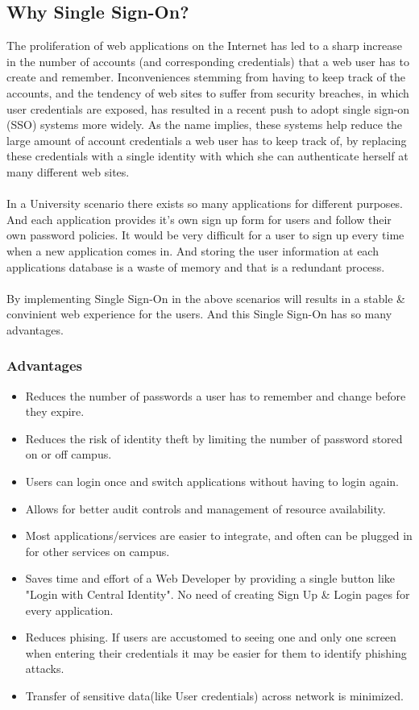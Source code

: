 \documentclass[12pt]{report}
\begin{document}
\subsection{Why Single Sign-On?}
\hspace{6mm}The proliferation of web applications on the Internet has led to a sharp increase in the number of accounts (and corresponding credentials) that a web user has to create and remember. Inconveniences stemming from having to keep track of the accounts, and the tendency of web sites to suffer from security breaches, in which user credentials are exposed, has resulted in a recent push to adopt single sign-on (SSO) systems more widely. As the name implies, these systems help reduce the large amount of account credentials a web user has to keep track of, by replacing these credentials with a single identity with which she can authenticate herself at many different web sites.\\
\\
\hspace{6mm}In a University scenario there exists so many applications for different purposes. And each application provides it's own sign up form for users and follow their own password policies. It would be very difficult for a user to sign up every time when a new application comes in. And storing the user information at each applications database is a waste of memory and that is a redundant process.
	\\
	\\
\hspace{6mm}By implementing Single Sign-On in the above scenarios will results in a stable \& convinient web experience for the users. And this Single Sign-On has so many advantages.
	\\
	\subsubsection{Advantages}
	\begin{itemize}
	\item Reduces the number of passwords a user has to remember and change before they expire.
	\item Reduces the risk of identity theft by limiting the number of password stored on or off campus.
	\item Users can login once and switch applications without having to login again.
	\item Allows for better audit controls and management of resource availability.
	\item Most applications/services are easier to integrate, and often can be plugged in for other services on campus.
	\item Saves time and effort of a Web Developer by providing a single button like "Login with Central Identity". No need of creating Sign Up \& Login pages for every application.
	\item Reduces phising. If users are accustomed to seeing one and only one screen when entering their credentials it may be easier for them to identify phishing attacks.
	\item Transfer of sensitive data(like User credentials) across network is minimized.
	\end{itemize}
\pagebreak
\end{document}
